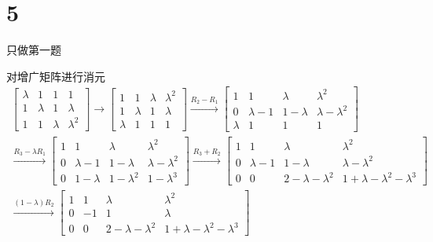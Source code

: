 \documentclass{article}
\begin{document}
\section*{5}

只做第一题

对增广矩阵进行消元
\begin{align*}
  \begin{bmatrix}
    \lambda & 1       & 1       & 1         \\
    1       & \lambda & 1       & \lambda   \\
    1       & 1       & \lambda & \lambda^2
  \end{bmatrix}
  \xrightarrow{}
  \begin{bmatrix}
    1       & 1       & \lambda & \lambda^2 \\
    1       & \lambda & 1       & \lambda   \\
    \lambda & 1       & 1       & 1
  \end{bmatrix}
  \xrightarrow{R_2 - R_1}
  \begin{bmatrix}
    1       & 1           & \lambda     & \lambda^2           \\
    0       & \lambda - 1 & 1 - \lambda & \lambda - \lambda^2 \\
    \lambda & 1           & 1           & 1
  \end{bmatrix}                       \\
  \xrightarrow{R_3 - \lambda R_1}
  \begin{bmatrix}
    1 & 1           & \lambda       & \lambda^2           \\
    0 & \lambda - 1 & 1 - \lambda   & \lambda - \lambda^2 \\
    0 & 1 - \lambda & 1 - \lambda^2 & 1 - \lambda^3
  \end{bmatrix}
  \xrightarrow{R_3 + R_2}
  \begin{bmatrix}
    1 & 1           & \lambda                 & \lambda^2                           \\
    0 & \lambda - 1 & 1 - \lambda             & \lambda - \lambda^2                 \\
    0 & 0           & 2 - \lambda - \lambda^2 & 1 + \lambda - \lambda^2 - \lambda^3
  \end{bmatrix} \\
  \xrightarrow{(1 - \lambda)R_2}
  \begin{bmatrix}
    1 & 1   & \lambda                 & \lambda^2                           \\
    0 & - 1 & 1                       & \lambda                             \\
    0 & 0   & 2 - \lambda - \lambda^2 & 1 + \lambda - \lambda^2 - \lambda^3
  \end{bmatrix}
\end{align*}
\end{document}
